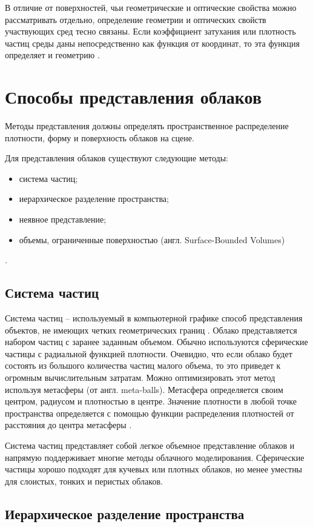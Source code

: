 В отличие от поверхностей, чьи геометрические и оптические свойства можно рассматривать отдельно, определение геометрии и оптических свойств участвующих сред тесно связаны. Если коэффициент затухания или плотность частиц среды даны непосредственно как функция от координат, то эта функция определяет и геометрию \cite{partmedia}.  


\section{Способы представления облаков}
Методы представления должны определять пространственное распределение плотности, форму и поверхность облаков на сцене.

Для представления облаков существуют следующие методы:
\begin{itemize}
	\item система частиц;
	\item иерархическое разделение пространства;
	\item неявное представление;
	\item объемы, ограниченные поверхностью (англ. Surface-Bounded Volumes)
\end{itemize}.

\subsection{Система частиц}
\label{particles}
Система частиц -- используемый в компьютерной графике способ представления объектов, не имеющих четких геометрических границ \cite{particles1}. 
Облако представляется набором частиц с заранее заданным объемом. Обычно используются сферические частицы с радиальной функцией плотности. Очевидно, что если облако будет состоять из большого количества частиц малого объема, то это приведет к огромным вычислительным затратам. Можно оптимизировать этот метод используя метасферы (от англ. meta-balls). Метасфера определяется своим центром, радиусом и плотностью в центре. Значение плотности в любой точке пространства определяется с помощью функции распределения плотностей от расстояния до центра метасферы \cite{nishita}. 

Система частиц представляет собой легкое объемное представление облаков и напрямую поддерживает многие методы облачного моделирования. Сферические частицы хорошо подходят для кучевых или плотных облаков, но менее уместны для слоистых, тонких и перистых облаков.

\subsection{Иерархическое разделение пространства} 

